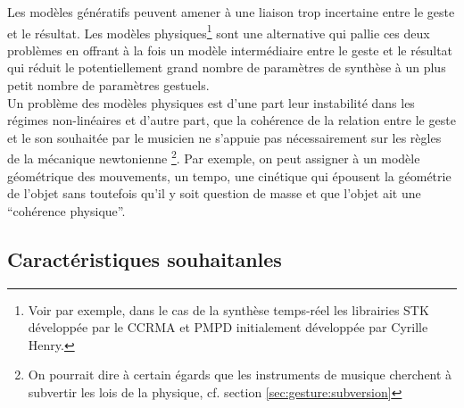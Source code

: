 Les modèles génératifs peuvent amener à une liaison trop incertaine entre le geste et le résultat. Les modèles physiques\footnote{Voir par exemple, dans le cas de la synthèse temps-réel les librairies \gls{STK} développée par le \gls{CCRMA} et PMPD initialement développée par Cyrille Henry.} sont une alternative qui pallie ces deux problèmes en offrant à la fois un modèle intermédiaire entre le geste et le résultat qui réduit le potentiellement grand nombre de paramètres de synthèse à un plus petit nombre de paramètres gestuels.\\
\indent Un problème des modèles physiques est d'une part leur instabilité dans les régimes non-linéaires et d'autre part, que la cohérence de la relation entre le geste et le son souhaitée par le musicien ne s'appuie pas nécessairement sur les règles de la mécanique newtonienne \footnote{On pourrait dire à certain égards que les instruments de musique cherchent à subvertir les lois de la physique, cf. section \ref{sec:gesture:subversion}}. Par exemple, on peut assigner à un modèle géométrique des mouvements, un tempo, une cinétique qui épousent la géométrie de l'objet sans toutefois qu'il y soit question de masse et que l'objet ait une ``cohérence physique''.

\subsection{Caractéristiques souhaitanles}

